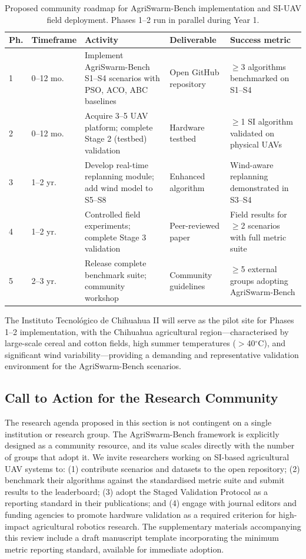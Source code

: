 \documentclass[review,3p,times]{elsarticle}
\begin{document}
\begin{table}[htbp]
\centering
\caption{Proposed community roadmap for AgriSwarm-Bench implementation and SI-UAV field deployment. Phases 1--2 run in parallel during Year 1.}
\label{tab:roadmap}
\begin{tabularx}{\textwidth}{llXlX}
\toprule
\textbf{Ph.} & \textbf{Timeframe} & \textbf{Activity} & \textbf{Deliverable} & \textbf{Success metric} \\
\midrule
1 & 0--12 mo. & Implement AgriSwarm-Bench S1--S4 scenarios with PSO, ACO, ABC baselines & Open GitHub repository & $\geq$3 algorithms benchmarked on S1--S4 \\
2 & 0--12 mo. & Acquire 3--5 UAV platform; complete Stage 2 (testbed) validation & Hardware testbed & $\geq$1 SI algorithm validated on physical UAVs \\
3 & 1--2 yr. & Develop real-time replanning module; add wind model to S5--S8 & Enhanced algorithm & Wind-aware replanning demonstrated in S3--S4 \\
4 & 1--2 yr. & Controlled field experiments; complete Stage 3 validation & Peer-reviewed paper & Field results for $\geq$2 scenarios with full metric suite \\
5 & 2--3 yr. & Release complete benchmark suite; community workshop & Community guidelines & $\geq$5 external groups adopting AgriSwarm-Bench \\
\bottomrule
\end{tabularx}
\end{table}

The Instituto Tecnológico de Chihuahua II will serve as the pilot site for Phases 1--2 implementation, with the Chihuahua agricultural region---characterised by large-scale cereal and cotton fields, high summer temperatures ($>$40$^\circ$C), and significant wind variability---providing a demanding and representative validation environment for the AgriSwarm-Bench scenarios.

\subsection{Call to Action for the Research Community}

The research agenda proposed in this section is not contingent on a single institution or research group. The AgriSwarm-Bench framework is explicitly designed as a community resource, and its value scales directly with the number of groups that adopt it. We invite researchers working on SI-based agricultural UAV systems to: (1) contribute scenarios and datasets to the open repository; (2) benchmark their algorithms against the standardised metric suite and submit results to the leaderboard; (3) adopt the Staged Validation Protocol as a reporting standard in their publications; and (4) engage with journal editors and funding agencies to promote hardware validation as a required criterion for high-impact agricultural robotics research. The supplementary materials accompanying this review include a draft manuscript template incorporating the minimum metric reporting standard, available for immediate adoption.
\end{document}
